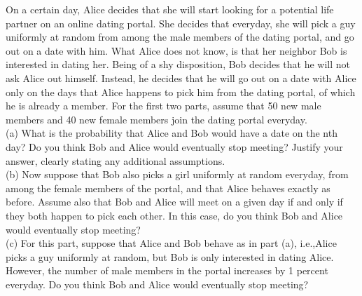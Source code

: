 \begin{exercise}
    On a certain day, Alice decides that she will start looking for a potential life partner on
    an online dating portal. She decides that everyday, she will pick a guy uniformly at random from among the
    male members of the dating portal, and go out on a date with him. What Alice does not know, is that her
    neighbor Bob is interested in dating her. Being of a shy disposition, Bob decides that he will not ask Alice
    out himself. Instead, he decides that he will go out on a date with Alice only on the days that Alice happens
    to pick him from the dating portal, of which he is already a member. For the first two parts, assume that
    50 new male members and 40 new female members join the dating portal everyday.\\

    (a) What is the probability that Alice and Bob would have a date on the nth day? Do you think Bob and
Alice would eventually stop meeting? Justify your answer, clearly stating any additional assumptions.\\

(b) Now suppose that Bob also picks a girl uniformly at random everyday, from among the female members
of the portal, and that Alice behaves exactly as before. Assume also that Bob and Alice will meet on
a given day if and only if they both happen to pick each other. In this case, do you think Bob and
Alice would eventually stop meeting?\\

(c) For this part, suppose that Alice and Bob behave as in part (a), i.e.,Alice picks a guy uniformly at
random, but Bob is only interested in dating Alice. However, the number of male members in the
portal increases by 1 percent everyday. Do you think Bob and Alice would eventually stop meeting?
\end{exercise}

